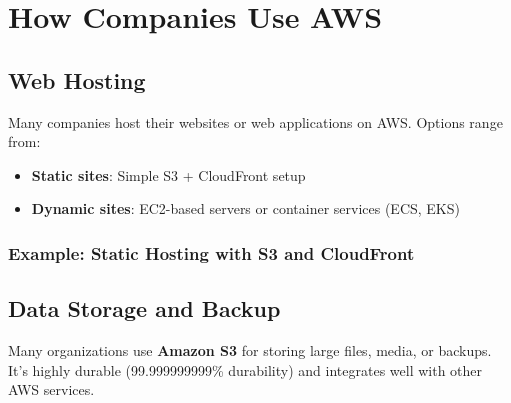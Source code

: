 \documentclass[11pt]{article}
\begin{document}
\clearpage

\section{How Companies Use AWS}

\subsection{Web Hosting}
Many companies host their websites or web applications on AWS. Options range from:
\begin{itemize}
    \item \textbf{Static sites}: Simple S3 + CloudFront setup
    \item \textbf{Dynamic sites}: EC2-based servers or container services (ECS, EKS)
\end{itemize}

\subsubsection{Example: Static Hosting with S3 and CloudFront}

\begin{center}
\end{center}

\subsection{Data Storage and Backup}
Many organizations use \textbf{Amazon S3} for storing large files, media, or backups. It’s highly durable (99.999999999\% durability) and integrates well with other AWS services.

\begin{center}
\end{center}
\end{document}
